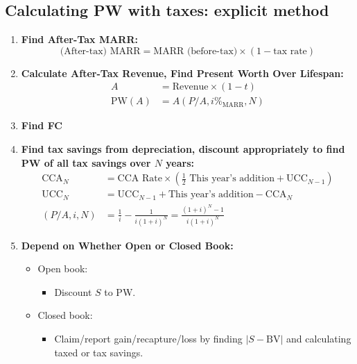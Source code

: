 \subsection{Calculating PW with taxes: explicit method}
\begin{process}
    \begin{enumerate}
        \item \textbf{Find After-Tax MARR:}
        \begin{equation}
            \text{(After-tax) MARR} = \text{MARR (before-tax)} \times (1 - \text{tax rate})
        \end{equation}
        \vspace{1em}
    
        \item \textbf{Calculate After-Tax Revenue, Find Present Worth Over Lifespan:}
        \begin{align}
            A &= \text{Revenue} \times (1 - t) \\
            \text{PW}(A) &= A \left( P/A, i\%_{\text{MARR}}, N \right)
        \end{align}
        \vspace{1em}

        \item \textbf{Find FC}
        \vspace{1em}
    
        \item \textbf{Find tax savings from depreciation, discount appropriately to find PW of all tax savings over \(N\) years:}
        \begin{align}
            \text{CCA}_N &= \text{CCA Rate} \times \left( \frac{1}{2} \text{ This year's addition} + \text{UCC}_{N-1} \right) \\
            \text{UCC}_N &= \text{UCC}_{N-1} + \text{This year's addition} - \text{CCA}_N \\
            (P/A, i, N) &= \frac{1}{i} - \frac{1}{i(1+i)^N} = \frac{(1+i)^N - 1}{i(1+i)^N}
        \end{align}
        \vspace{1em}
    
        \item \textbf{Depend on Whether Open or Closed Book:}
        \begin{itemize}
            \item Open book:
            \begin{itemize}
                \item Discount \(S\) to PW.
            \end{itemize}
            \item Closed book:
            \begin{itemize}
                \item Claim/report gain/recapture/loss by finding \(\left| S - \text{BV} \right|\) and calculating taxed or tax savings.
            \end{itemize}
        \end{itemize}
        \vspace{1em}


\end{enumerate}
\end{process}
